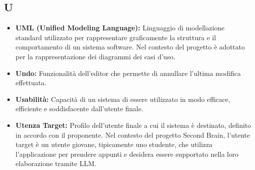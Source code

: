 {}
\subsection*{U}
\begin{itemize}
      \item \textbf{UML (Unified Modeling Language):} Linguaggio di modellazione
      standard utilizzato per rappresentare graficamente la struttura e il
      comportamento di un sistema software. Nel contesto del progetto è
      adottato per la rappresentazione dei diagrammi dei casi d'uso.
      \item \textbf{Undo:} Funzionalità dell'editor che permette di annullare l'ultima modifica effettuata.
      \item \textbf{Usabilità:} Capacità di un sistema di essere utilizzato in modo efficace, efficiente e soddisfacente dall'utente finale.
      \item \textbf{Utenza Target:} Profilo dell'utente finale a cui il sistema
      è destinato, definito in accordo con il proponente. Nel contesto del
      progetto Second Brain, l'utente target è un utente giovane,
      tipicamente uno studente, che utilizza l'applicazione per prendere
      appunti e desidera essere supportato nella loro elaborazione tramite
      LLM.
\end{itemize}
 
{}
